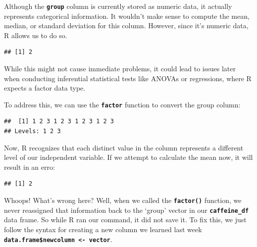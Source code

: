 \documentclass[
]{book}
\newenvironment{Shaded}{\begin{snugshade}}{\end{snugshade}}
\newcommand{\FunctionTok}[1]{\textcolor[rgb]{0.13,0.29,0.53}{\textbf{#1}}}
\newcommand{\NormalTok}[1]{#1}
\newcommand{\SpecialCharTok}[1]{\textcolor[rgb]{0.81,0.36,0.00}{\textbf{#1}}}
\begin{document}
Although the \textbf{\texttt{group}} column is currently stored as numeric data, it actually represents categorical information. It wouldn't make sense to compute the mean, median, or standard deviation for this column. However, since it's numeric data, R allows us to do so.

\begin{Shaded}
\end{Shaded}

\begin{verbatim}
## [1] 2
\end{verbatim}

While this might not cause immediate problems, it could lead to issues later when conducting inferential statistical tests like ANOVAs or regressions, where R expects a factor data type.

To address this, we can use the \textbf{\texttt{factor}} function to convert the group column:

\begin{Shaded}
\end{Shaded}

\begin{verbatim}
##  [1] 1 2 3 1 2 3 1 2 3 1 2 3
## Levels: 1 2 3
\end{verbatim}

Now, R recognizes that each distinct value in the column represents a different level of our independent variable. If we attempt to calculate the mean now, it will result in an erro:

\begin{Shaded}
\end{Shaded}

\begin{verbatim}
## [1] 2
\end{verbatim}

Whoops! What's wrong here? Well, when we called the \textbf{\texttt{factor()}} function, we never reassigned that information back to the `group' vector in our \textbf{\texttt{caffeine\_df}} data frame. So while R ran our command, it did not save it. To fix this, we just follow the syntax for creating a new column we learned last week \textbf{\texttt{data.frame\$newcolumn\ \textless{}-\ vector}}.
\end{document}
